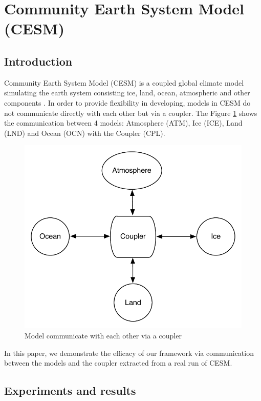 \section{Community Earth System Model (CESM)}
\label{sec:cesm}

\subsection{Introduction}

Community Earth System Model (CESM) is a coupled global climate model simulating the earth system consisting ice, land, ocean, atmospheric and other components \cite{CESM:Hurrell}. In order to provide flexibility in developing, models in CESM do not communicate directly with each other but via a coupler. The Figure \ref{fig:mct} shows the communication between 4 models: Atmosphere (ATM), Ice (ICE), Land (LND) and Ocean (OCN) with the Coupler (CPL).

\begin{figure}[!htb]
\vspace{-0.15in}
\centering
\includegraphics[scale=0.5]{figures/mct.pdf}
\vspace{-0.15in}
\caption{Model communicate with each other via a coupler}
\vspace{-0.15in}
\label{fig:mct}
\end{figure}

In this paper, we demonstrate the efficacy of our framework via communication between the models and the coupler extracted from a real run of CESM.

\subsection{Experiments and results}




